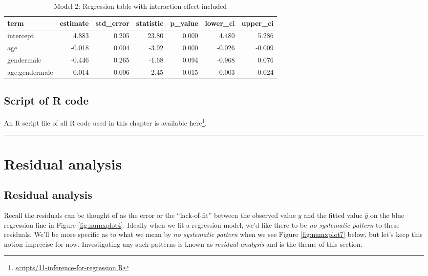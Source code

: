 \documentclass[12pt, krantz2,]{krantz}
\renewcommand{\href}[2]{#2\footnote{\url{#1}}}
\begin{document}
\begin{table}[H]

\caption{\label{tab:unnamed-chunk-401}Model 2: Regression table with interaction effect included}
\centering
\fontsize{10}{12}\selectfont
\begin{tabular}{lrrrrrr}
\toprule
term & estimate & std\_error & statistic & p\_value & lower\_ci & upper\_ci\\
\midrule
intercept & 4.883 & 0.205 & 23.80 & 0.000 & 4.480 & 5.286\\
age & -0.018 & 0.004 & -3.92 & 0.000 & -0.026 & -0.009\\
gendermale & -0.446 & 0.265 & -1.68 & 0.094 & -0.968 & 0.076\\
age:gendermale & 0.014 & 0.006 & 2.45 & 0.015 & 0.003 & 0.024\\
\bottomrule
\end{tabular}
\end{table}

\hypertarget{script-of-r-code-2}{%
\subsection{Script of R code}\label{script-of-r-code-2}}

An R script file of all R code used in this chapter is available \href{scripts/11-inference-for-regression.R}{here}.

\begin{center}\rule{0.5\linewidth}{\linethickness}\end{center}

\hypertarget{residual-analysis}{%
\section{Residual analysis}\label{residual-analysis}}

\hypertarget{model1residuals}{%
\subsection{Residual analysis}\label{model1residuals}}

Recall the residuals can be thought of as the error or the ``lack-of-fit'' between the observed value \(y\) and the fitted value \(\widehat{y}\) on the blue regression line in Figure \ref{fig:numxplot4}. Ideally when we fit a regression model, we'd like there to be \emph{no systematic pattern} to these residuals. We'll be more specific as to what we mean by \emph{no systematic pattern} when we see Figure \ref{fig:numxplot7} below, but let's keep this notion imprecise for now. Investigating any such patterns is known as \emph{residual analysis} and is the theme of this section.
\end{document}
